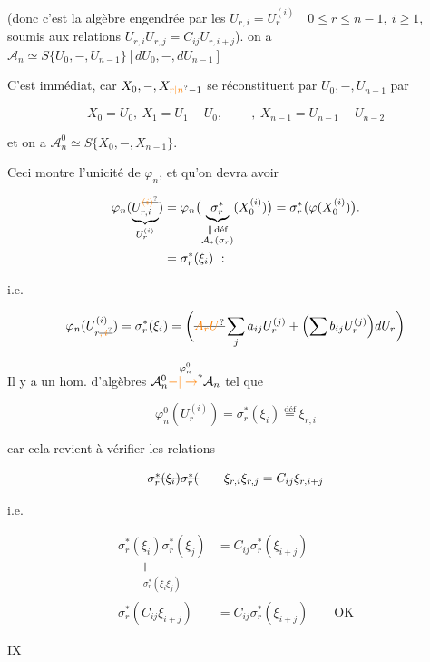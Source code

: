 
 (donc c'est la algèbre engendrée par les $U_{r,i}=U_r^{(i)}\quad 0\leq r\leq n-1,\ i\geq1$, soumis aux relations $U_{r,i}U_{r,j}=C_{ij}U_{r,i+j}$).  on a $\mathcal A_n\simeq S\{U_0,-,U_{n-1}\}[dU_0,-,dU_{n-1}]$

C'est immédiat, car $X_0,-,X_{\unsure{r|n}-1}$ se réconstituent par $U_0,-,U_{n-1}$ par

\[
X_0=U_0,\ X_1=U_1-U_0,\ --,\ X_{n-1}=U_{n-1}-U_{n-2}
\]

et on a $\mathcal A_n^0\simeq S\{X_0,-,X_{n-1}\}$. 

Ceci montre l'unicité de $\varphi_n$, et qu'on devra avoir

\[
\begin{aligned}
\varphi_n(\underbrace{U_{r,i}^{\deleted{\unsure{(i)}}}}_{U_r^{(i)}})
 &=\varphi_n\bigl(\underbrace{\sigma_r^*}_{\substack{\Vert\,\text{déf}\\\mathcal A_*(\sigma_r)}}(X_0^{(i)})\bigr)
 =\sigma_r^*\bigl(\varphi(X_0^{(i)})\bigr).\\
 &=\sigma_r^*(\xi_i)\ :
\end{aligned}
\]

i.e.

\[
\varphi_n(U_{r\deleted{\unsure{,i}}}^{(i)})=\sigma_r^*(\xi_i)
=\biggl(\deleted{\unsure{A_r U}}\sum_j a_{ij}U_r^{(j)}+\Bigl(\sum b_{ij}U_r^{(j)}\Bigr)dU_r\biggr)
\]

Il y a  un hom. d'algèbres  $\mathcal A_n^0\overset{\varphi_n^0}{\unsure{-|\to}}\mathcal A_n$ tel que

\[
\varphi_n^0(U_r^{(i)})=\sigma_r^*(\xi_i)\overset{\text{déf}}{=}\xi_{r,i}
\]

car cela revient à vérifier les relations

\[
\deleted{\sigma_r^*(\xi_i)\sigma_r^*(}\qquad
\xi_{r,i}\xi_{r,j}=C_{ij}\xi_{r,i+j}
\]

i.e.

\[
\begin{aligned}
\underset{\substack{\Vert\\\sigma_r^*(\xi_i\xi_j)}}{\sigma_r^*(\xi_i)\sigma_r^*(\xi_j)}&=C_{ij}\sigma_r^*(\xi_{i+j})\\
\sigma_r^*(C_{ij}\xi_{i+j})&=C_{ij}\sigma_r^*(\xi_{i+j})\qquad\mathrm{OK}
\end{aligned}
\]


\hfill IX


